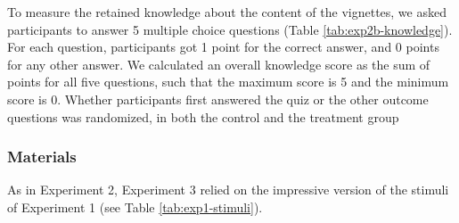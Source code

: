 \documentclass[
  english,
  doc,floatsintext]{apa6}
\begin{document}
To measure the retained knowledge about the content of the vignettes, we asked participants to answer 5 multiple choice questions (Table \ref{tab:exp2b-knowledge}). For each question, participants got 1 point for the correct answer, and 0 points for any other answer. We calculated an overall knowledge score as the sum of points for all five questions, such that the maximum score is 5 and the minimum score is 0. Whether participants first answered the quiz or the other outcome questions was randomized, in both the control and the treatment group

\subsubsection{Materials}\label{materials-4}

As in Experiment 2, Experiment 3 relied on the impressive version of the stimuli of Experiment 1 (see Table \ref{tab:exp1-stimuli}).

\begingroup\fontsize{8}{10}\selectfont
\end{document}
